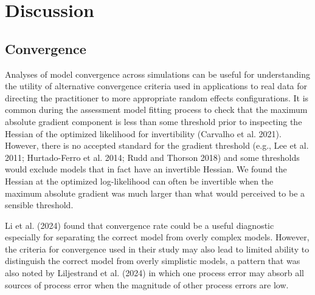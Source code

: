 \documentclass[
  12pt,
]{article}
\begin{document}
\hypertarget{discussion}{%
\section*{Discussion}\label{discussion}}

\hypertarget{convergence-1}{%
\subsection*{Convergence}\label{convergence-1}}

Analyses of model convergence across simulations can be useful for
understanding the utility of alternative convergence criteria used in
applications to real data for directing the practitioner to more
appropriate random effects configurations. It is common during the
assessment model fitting process to check that the maximum absolute
gradient component is less than some threshold prior to inspecting the
Hessian of the optimized likelihood for invertibility (Carvalho et al.
2021). However, there is no accepted standard for the gradient threshold
(e.g., Lee et al. 2011; Hurtado-Ferro et al. 2014; Rudd and Thorson
2018) and some thresholds would exclude models that in fact have an
invertible Hessian. We found the Hessian at the optimized log-likelihood
can often be invertible when the maximum absolute gradient was much
larger than what would perceived to be a sensible threshold.

Li et al. (2024) found that convergence rate could be a useful
diagnostic especially for separating the correct model from overly
complex models. However, the criteria for convergence used in their
study may also lead to limited ability to distinguish the correct model
from overly simplistic models, a pattern that was also noted by
Liljestrand et al. (2024) in which one process error may absorb all
sources of process error when the magnitude of other process errors are
low.
\end{document}
